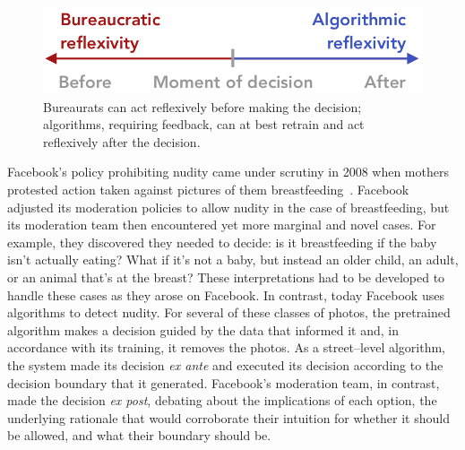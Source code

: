 \documentclass[main]{subfiles}
\begin{document}
\begin{figure}
  \centering
  \includegraphics[width=\columnwidth]{figures/timeline.png}
  \caption{Bureaurats can act reflexively before making the decision; algorithms, requiring feedback, can at best retrain and act reflexively after the decision.\vspace{-0.5em}}
  \label{fig:timeline}
\end{figure}

Facebook's policy prohibiting nudity came under scrutiny
in 2008 when mothers protested action taken against
pictures of them breastfeeding~\cite{ibrahim2010breastfeeding}.
Facebook adjusted its moderation policies
to allow nudity in the case of breastfeeding, but
its moderation team then encountered yet more marginal and novel cases.
For example, they discovered they needed to decide:
is it breastfeeding if the baby isn't actually eating?
What if it's not a baby, but instead an older child, an adult, or an animal that's at the breast?
These interpretations had to be developed to handle these cases as they arose on Facebook.
In contrast, today Facebook uses algorithms to detect nudity.
For several of these classes of photos,
the pretrained algorithm makes a decision guided by the data that informed it and,
in accordance with its training, it removes the photos.
As a street--level algorithm,
the system made its decision \textit{ex ante} and executed its decision according to the decision boundary that it generated.
Facebook's moderation team, in contrast, made the decision \textit{ex post},
debating about the implications of each option,
the underlying rationale that would corroborate their intuition for whether it should be allowed, and
what their boundary should be.


%   
%   
\end{document}
